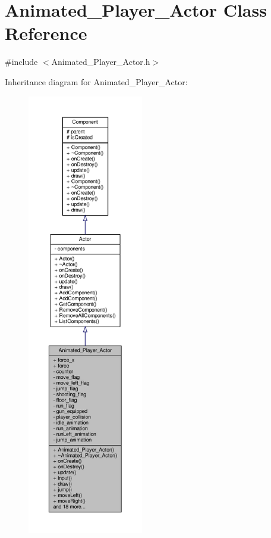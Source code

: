 \hypertarget{classAnimated__Player__Actor}{}\section{Animated\+\_\+\+Player\+\_\+\+Actor Class Reference}
\label{classAnimated__Player__Actor}


{\ttfamily \#include $<$Animated\+\_\+\+Player\+\_\+\+Actor.\+h$>$}



Inheritance diagram for Animated\+\_\+\+Player\+\_\+\+Actor\+:
\nopagebreak
\begin{figure}[H]
\begin{center}
\leavevmode
\includegraphics[height=550pt]{classAnimated__Player__Actor__inherit__graph}
\end{center}
\end{figure}


